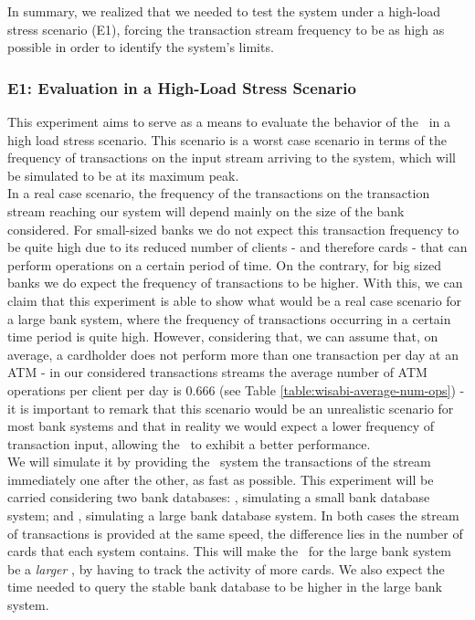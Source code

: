 In summary, we realized that we needed to test the system under a high-load stress scenario (E1), forcing the transaction stream frequency to be as high as possible in order to identify the system's limits.

\subsubsection{E1: Evaluation in a High-Load Stress Scenario}\label{exps-design-e1}

This experiment aims to serve as a means to evaluate the behavior of the \DPATM\ in a high load stress scenario. This scenario is a worst case scenario in terms of the frequency of transactions on the input stream arriving to the system, which will be simulated to be at its maximum peak.\\

In a real case scenario, the frequency of the transactions on the transaction stream reaching our system will depend mainly on the size of the bank considered. For small-sized banks we do not expect this transaction frequency to be quite high due to its reduced number of clients - and therefore cards - that can perform operations on a certain period of time. On the contrary, for big sized banks we do expect the frequency of transactions to be higher. With this, we can claim that this experiment is able to show what would be a real case scenario for a large bank system, where the frequency of transactions occurring in a certain time period is quite high. However, considering that, we can assume that, on average, a cardholder does not perform more than one transaction per day at an ATM 
 - in our considered transactions streams the average number of ATM operations per client per day is $\mathsf{0.666}$ (see Table \ref{table:wisabi-average-num-ops}) - it is important to remark that this scenario would be an unrealistic scenario for most bank systems and that in reality we would expect a lower frequency of transaction input, allowing the \DPATM\ to exhibit a better performance.\\

We will simulate it by providing the \DPATM\ system the transactions of the stream immediately one after the other, as fast as possible. This experiment will be carried considering two bank databases: \smallG, simulating a small bank database system; and \mediumG, simulating a large bank database system. In both cases the stream of transactions is provided at the same speed, the difference lies in the number of cards that each system contains. This will make the \DPATM\ for the large bank system be a \emph{larger} \DPATM, by having to track the activity of more cards. We also expect the time needed to query the stable bank database to be higher in the large bank system.\\

